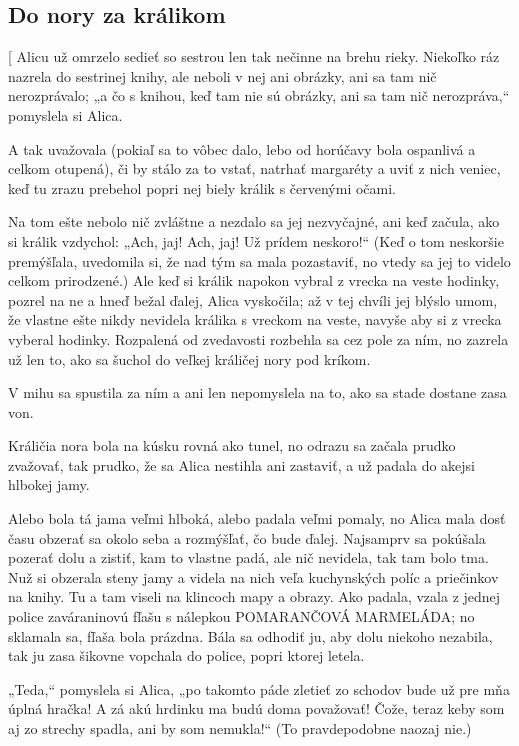 \documentclass[12pt]{book}
\begin{document}
\begin{Parallel}[p]{}{}
{\chapter{}
\section{Do nory za králikom}[
Alicu už omrzelo sedieť so sestrou len tak nečinne na brehu rieky. Niekoľko ráz nazrela do sestrinej knihy, ale neboli v nej ani obrázky, ani sa tam nič nerozprávalo; „a čo s knihou, keď tam nie sú obrázky, ani sa tam nič nerozpráva,“ pomyslela si Alica.

A tak uvažovala (pokiaľ sa to vôbec dalo, lebo od horúčavy bola ospanlivá a celkom otupená), či by stálo za to vstať, natrhať margaréty a uviť z nich veniec, keď tu zrazu prebehol popri nej biely králik s červenými očami.

Na tom ešte nebolo nič zvláštne a nezdalo sa jej nezvyčajné, ani keď začula, ako si králik vzdychol: „Ach, jaj! Ach, jaj! Už prídem neskoro!“ (Keď o tom neskoršie premýšľala, uvedomila si, že nad tým sa mala pozastaviť, no vtedy sa jej to videlo celkom prirodzené.) Ale keď si králik napokon vybral z vrecka na veste hodinky, pozrel na ne a hneď bežal ďalej, Alica vyskočila; až v tej chvíli jej blýslo umom, že vlastne ešte nikdy nevidela králika s vreckom na veste, navyše aby si z vrecka vyberal hodinky. Rozpalená od zvedavosti rozbehla sa cez pole za ním, no zazrela už len to, ako sa šuchol do veľkej králičej nory pod kríkom.

V mihu sa spustila za ním a ani len nepomyslela na to, ako sa stade dostane zasa von.

Králičia nora bola na kúsku rovná ako tunel, no odrazu sa začala prudko zvažovať, tak prudko, že sa Alica nestihla ani zastaviť, a už padala do akejsi hlbokej jamy.

Alebo bola tá jama veľmi hlboká, alebo padala veľmi pomaly, no Alica mala dosť času obzerať sa okolo seba a rozmýšľať, čo bude ďalej. Najsamprv sa pokúšala pozerať dolu a zistiť, kam to vlastne padá, ale nič nevidela, tak tam bolo tma. Nuž si obzerala steny jamy a videla na nich veľa kuchynských políc a priečinkov na knihy. Tu a tam viseli na klincoch mapy a obrazy. Ako padala, vzala z jednej police zaváraninovú fľašu s nálepkou POMARANČOVÁ MARMELÁDA; no sklamala sa, fľaša bola prázdna. Bála sa odhodiť ju, aby dolu niekoho nezabila, tak ju zasa šikovne vopchala do police, popri ktorej letela.

„Teda,“ pomyslela si Alica, „po takomto páde zletieť zo schodov bude už pre mňa úplná hračka! A zá akú hrdinku ma budú doma považovať! Čože, teraz keby som aj zo strechy spadla, ani by som nemukla!“ (To pravdepodobne naozaj nie.)

}
\end{Parallel}
\end{document}
